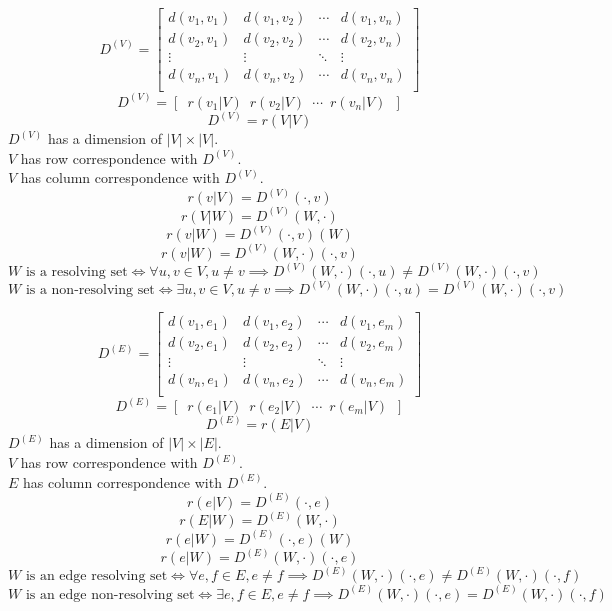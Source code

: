 \documentclass{article}
\begin{document}
\[
	D^{(V)} = \left[
	\begin{array}{cccc}
		d(v_1, v_1) & d(v_1, v_2) & \cdots & d(v_1, v_n) \\
		d(v_2, v_1) & d(v_2, v_2) & \cdots & d(v_2, v_n) \\
		\vdots & \vdots & \ddots & \vdots \\
		d(v_n, v_1) & d(v_n, v_2) & \cdots & d(v_n, v_n) \\
	\end{array}
	\right]
\]
\[ D^{(V)} = \left[\enspace r(v_1|V)\enspace r(v_2|V)\enspace \cdots\enspace r(v_n|V)\enspace \right] \]
\[ D^{(V)} = r(V|V) \]
\(D^{(V)}\) has a dimension of \(|V| \times |V|\). \\
\(V\) has row correspondence with \(D^{(V)}\). \\
\(V\) has column correspondence with \(D^{(V)}\).
\[ r(v|V) = D^{(V)}(\cdot, v) \]
\[ r(V|W) = D^{(V)}(W, \cdot) \]
\[ r(v|W) = D^{(V)}(\cdot, v)(W) \]
\[ r(v|W) = D^{(V)}(W, \cdot)(\cdot, v) \]
\[ W \text{ is a resolving set} \iff \forall u, v \in V, u \neq v \implies D^{(V)}(W, \cdot)(\cdot, u) \neq D^{(V)}(W, \cdot)(\cdot, v) \]
\[ W \text{ is a non-resolving set} \iff \exists u, v \in V, u \neq v \implies D^{(V)}(W, \cdot)(\cdot, u) = D^{(V)}(W, \cdot)(\cdot, v) \]

\[
	D^{(E)} = \left[
	\begin{array}{cccc}
		d(v_1, e_1) & d(v_1, e_2) & \cdots & d(v_1, e_m) \\
		d(v_2, e_1) & d(v_2, e_2) & \cdots & d(v_2, e_m) \\
		\vdots & \vdots & \ddots & \vdots \\
		d(v_n, e_1) & d(v_n, e_2) & \cdots & d(v_n, e_m) \\
	\end{array}
	\right]
\]
\[ D^{(E)} = \left[\enspace r(e_1|V)\enspace r(e_2|V)\enspace \cdots\enspace r(e_m|V)\enspace \right] \]
\[ D^{(E)} = r(E|V) \]
\(D^{(E)}\) has a dimension of \(|V| \times |E|\). \\
\(V\) has row correspondence with \(D^{(E)}\). \\
\(E\) has column correspondence with \(D^{(E)}\).
\[ r(e|V) = D^{(E)}(\cdot, e) \]
\[ r(E|W) = D^{(E)}(W, \cdot) \]
\[ r(e|W) = D^{(E)}(\cdot, e)(W) \]
\[ r(e|W) = D^{(E)}(W, \cdot)(\cdot, e) \]
\[ W \text{ is an edge resolving set} \iff \forall e, f \in E, e \neq f \implies D^{(E)}(W, \cdot)(\cdot, e) \neq D^{(E)}(W, \cdot)(\cdot, f) \]
\[ W \text{ is an edge non-resolving set} \iff \exists e, f \in E, e \neq f \implies D^{(E)}(W, \cdot)(\cdot, e) = D^{(E)}(W, \cdot)(\cdot, f) \]
\end{document}
